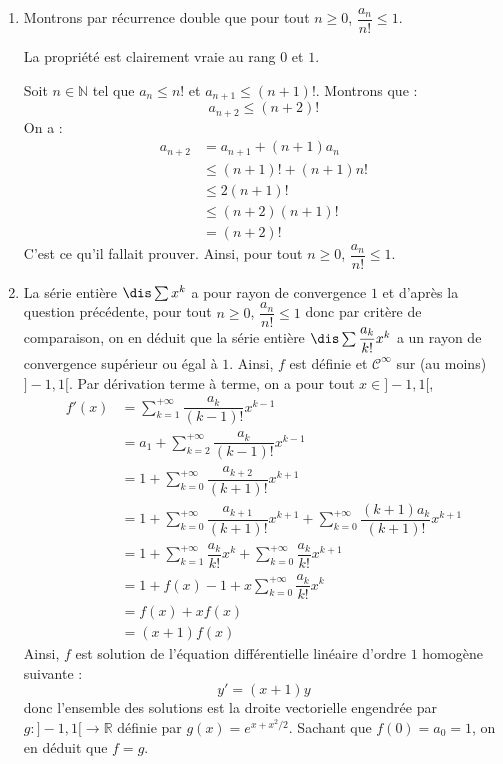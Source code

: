 \documentclass[a4paper,10pt]{report}
\begin{document}
\corr \begin{enumerate}
\item Montrons par récurrence double que pour tout $n \geq 0$, $\dfrac{a_n}{n!} \leq 1$.

\medskip

\noindent La propriété est clairement vraie au rang $0$ et $1$.

\medskip

\noindent Soit $n \in \mathbb{N}$ tel que $a_n \leq n!$ et $a_{n+1} \leq (n+1)!$. Montrons que :
$$ a_{n+2} \leq (n+2)!$$
On a :
\begin{align*}
a_{n+2} & = a_{n+1} + (n+1)a_n \\
& \leq (n+1)! + (n+1) n! \\
& \leq 2(n+1)! \\
& \leq (n+2)(n+1)! \\
& = (n+2)!
\end{align*}
C'est ce qu'il fallait prouver. Ainsi, pour tout $n \geq 0$, $\dfrac{a_n}{n!} \leq 1$.
\item La série entière $\dis \sum x^k $ a pour rayon de convergence $1$ et d'après la question précédente, pour tout $n \geq 0$, $\dfrac{a_n}{n!} \leq 1$ donc par critère de comparaison, on en déduit que la série entière $\dis \sum \dfrac{a_k}{k!}x^k$ a un rayon de convergence supérieur ou égal à $1$. Ainsi, $f$ est définie et $\mathcal{C}^{\infty}$ sur (au moins) $]-1,1[$. Par dérivation terme à terme, on a pour tout $x \in ]-1,1[$,
\begin{align*}
f'(x) & = \sum_{k=1}^{+ \infty} \dfrac{a_k}{(k-1)!} x^{k-1} \\
& = a_1 + \sum_{k=2}^{+ \infty} \dfrac{a_k}{(k-1)!} x^{k-1} \\
& = 1 + \sum_{k=0}^{+ \infty} \dfrac{a_{k+2}}{(k+1)!} x^{k+1} \\
& = 1+ \sum_{k=0}^{+ \infty} \dfrac{a_{k+1}}{(k+1)!} x^{k+1}  + \sum_{k=0}^{+ \infty} \dfrac{(k+1)a_{k}}{(k+1)!} x^{k+1} \\
& = 1+ \sum_{k=1}^{+ \infty} \dfrac{a_{k}}{k!} x^{k} +  \sum_{k=0}^{+ \infty} \dfrac{a_{k}}{k!} x^{k+1} \\
& = 1+ f(x)-1  + x \sum_{k=0}^{+ \infty} \dfrac{a_{k}}{k!} x^{k} \\
& = f(x)+xf(x) \\
& = (x+1)f(x)
\end{align*} 
Ainsi, $f$ est solution de l'équation différentielle linéaire d'ordre $1$ homogène suivante :
$$ y'=(x+1)y$$
donc l'ensemble des solutions est la droite vectorielle engendrée par $g : ]-1,1[ \rightarrow \mathbb{R}$ définie par $g(x)=e^{x+x^2/2}$. Sachant que $f(0)=a_0=1$, on en déduit que $f=g$.

\end{enumerate}
\end{document}
